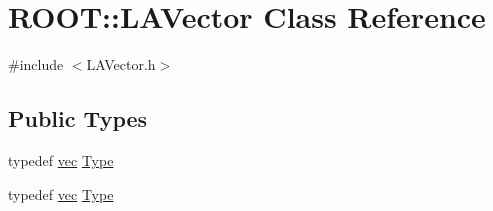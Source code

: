 \hypertarget{classROOT_1_1Minuit2_1_1LAVector}{}\section{R\+O\+OT\+:\+:L\+A\+Vector Class Reference}
\label{classROOT_1_1Minuit2_1_1LAVector}


{\ttfamily \#include $<$L\+A\+Vector.\+h$>$}

\subsection*{Public Types}
\begin{DoxyCompactItemize}
\item 
typedef \mbox{\hyperlink{classROOT_1_1Minuit2_1_1vec}{vec}} \mbox{\hyperlink{classROOT_1_1Minuit2_1_1LAVector_a3ca6d24ac34f5e322623ac131e090f20}{Type}}
\item 
typedef \mbox{\hyperlink{classROOT_1_1Minuit2_1_1vec}{vec}} \mbox{\hyperlink{classROOT_1_1Minuit2_1_1LAVector_a3ca6d24ac34f5e322623ac131e090f20}{Type}}
\end{DoxyCompactItemize}
